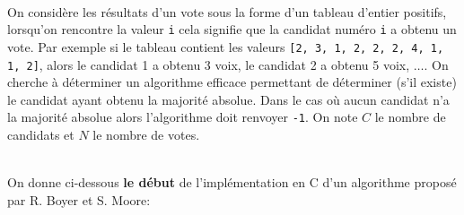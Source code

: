 \documentclass[11pt,a4paper]{article}
\begin{document}
\begin{Exercise}[title={majorité absolue}]\\
On considère les résultats d'un vote sous la forme d'un tableau d'entier positifs, lorsqu'on rencontre la valeur {\tt i} cela signifie que la candidat numéro {\tt i} a obtenu un vote. Par exemple si le tableau contient les valeurs {\tt [2, 3, 1, 2, 2, 2, 4, 1, 1, 2]}, alors le candidat 1 a obtenu 3 voix, le candidat 2 a obtenu 5 voix, $\dots$.
On cherche à déterminer un algorithme efficace permettant de déterminer (s'il existe) le candidat ayant obtenu la majorité absolue. Dans le cas où aucun candidat n'a la majorité absolue alors l'algorithme doit renvoyer {\tt -1}.
On note $C$ le nombre de candidats et $N$ le nombre de votes.

\\
On donne ci-dessous \textbf{le début} de l'implémentation en C d'un algorithme  proposé par R. Boyer et S. Moore:
\end{Exercise}
\end{document}
